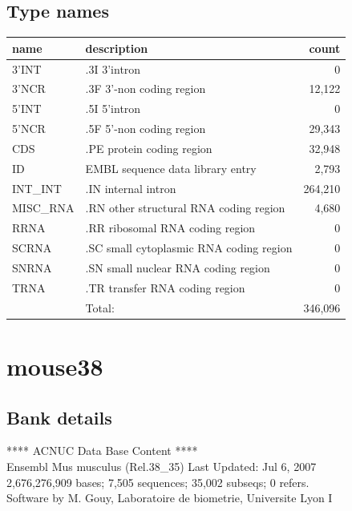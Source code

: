 \documentclass{article}
\begin{document}
\begin{Schunk}
\subsection{Type names}
\noindent\begin{tabular}{llr}
\hline \hline
name & description & count \\
\hline
3'INT  &  .3I 3'intron  &  0 \\
3'NCR  &  .3F  3'-non coding region  &  12,122 \\
5'INT  &  .5I 5'intron  &  0 \\
5'NCR  &  .5F  5'-non coding region  &  29,343 \\
CDS  &  .PE protein coding region  &  32,948 \\
ID  &  EMBL sequence data library entry  &  2,793 \\
INT\_INT  &  .IN  internal intron  &  264,210 \\
MISC\_RNA  &  .RN other structural RNA coding region  &  4,680 \\
RRNA  &  .RR ribosomal RNA coding region  &  0 \\
SCRNA  &  .SC small cytoplasmic RNA coding region  &  0 \\
SNRNA  &  .SN small nuclear RNA coding region  &  0 \\
TRNA  &  .TR transfer RNA coding region  &  0 \\
\hline
 & Total: & 346,096 \\
\hline \hline
\end{tabular}

\section{ mouse38 }
\subsection{Bank details}
             ****     ACNUC Data Base Content      ****                         \\
          Ensembl Mus musculus (Rel.38\_35) Last Updated: Jul  6, 2007\\
2,676,276,909 bases; 7,505 sequences; 35,002 subseqs; 0 refers.\\
Software by M. Gouy, Laboratoire de biometrie, Universite Lyon I 


\end{Schunk}
\end{document}
